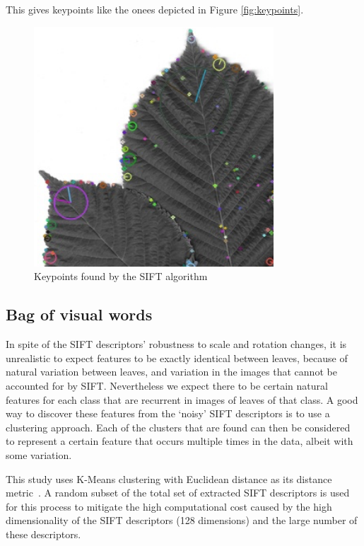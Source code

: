 This gives keypoints like the onees depicted in Figure \vref{fig:keypoints}.
\begin{figure}[htb!]
    \centering
    \includegraphics[width=0.8\textwidth]{keypoints.png}
    \caption{Keypoints found by the SIFT algorithm}
    \label{fig:keypoints}
\end{figure}



\subsection{Bag of visual words}
In spite of the SIFT descriptors' robustness to scale and rotation changes, it is unrealistic to expect features to be exactly identical between leaves, because of natural variation between leaves, and variation in the images that cannot be accounted for by SIFT.
Nevertheless we expect there to be certain natural features for each class that are recurrent in images of leaves of that class.
A good way to discover these features from the `noisy' SIFT descriptors is to use a clustering approach.
Each of the clusters that are found can then be considered to represent a certain feature that occurs multiple times in the data, albeit with some variation.

This study uses K-Means clustering with Euclidean distance as its distance metric~\cite{macqueen1967}.
A random subset of the total set of extracted SIFT descriptors is used for this process to mitigate the high computational cost caused by the high dimensionality of the SIFT descriptors (128 dimensions) and the large number of these descriptors.

